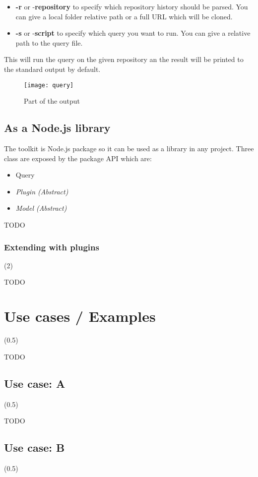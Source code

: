 \begin{itemize}
	\item \textbf{-r} or -\textbf{repository} to specify which repository history should be parsed. You can give a local folder relative path or a full URL which will be cloned.
	\item \textbf{-s} or -\textbf{script} to specify which query you want to run. You can give a relative path to the query file.
\end{itemize}

This will run the query on the given repository an the result will be printed to the standard output by default.

\begin{figure}[H]
	\centering
	\texttt{[image: query]}
	\caption{Part of the output}
	\label{fig:fig-query}
\end{figure}


\subsection{As a Node.js library}

The toolkit is Node.js package so it can be used as a library in any project.
Three class are exposed by the package API which are:
\begin{itemize}
	\item Query
	\item \textit{Plugin (Abstract)}
	\item \textit{Model (Abstract)}
\end{itemize}

TODO


\subsubsection{Extending with plugins} (2)

TODO

\section{Use cases / Examples} (0.5)

TODO

\subsection{Use case: A} (0.5)

TODO

\subsection{Use case: B} (0.5)

